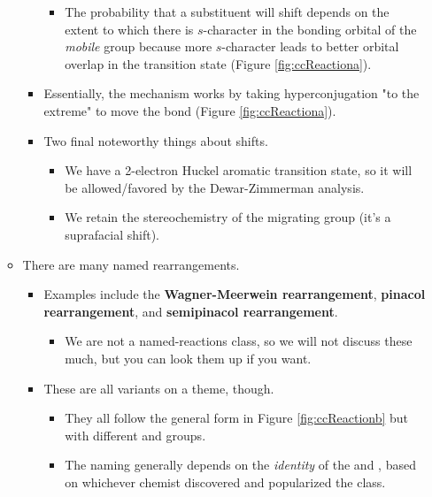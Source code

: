 \documentclass[../notes.tex]{subfiles}
\begin{document}
\begin{itemize}
\begin{itemize}
\begin{itemize}
            \begin{itemize}
                \item The probability that a substituent will shift depends on the extent to which there is $s$-character in the bonding orbital of the \emph{mobile} group because more $s$-character leads to better orbital overlap in the transition state (Figure \ref{fig:ccReactiona}).
            \end{itemize}
            \item Essentially, the mechanism works by taking hyperconjugation "to the extreme" to move the bond (Figure \ref{fig:ccReactiona}).
            \item Two final noteworthy things about shifts.
            \begin{itemize}
                \item We have a 2-electron Huckel aromatic transition state, so it will be allowed/favored by the Dewar-Zimmerman analysis.
                \item We retain the stereochemistry of the migrating group (it's a suprafacial shift).
            \end{itemize}
        \end{itemize}
        \item There are many named rearrangements.
        \begin{itemize}
            \item Examples include the \textbf{Wagner-Meerwein rearrangement}, \textbf{pinacol rearrangement}, and \textbf{semipinacol rearrangement}.
            \begin{itemize}
                \item We are not a named-reactions class, so we will not discuss these much, but you can look them up if you want.
            \end{itemize}
            \item These are all variants on a theme, though.
            \begin{itemize}
                \item They all follow the general form in Figure \ref{fig:ccReactionb} but with different  and  groups.
                \item The naming generally depends on the \emph{identity} of the  and , based on whichever chemist discovered and popularized the class.
            \end{itemize}
        \end{itemize}
    \end{itemize}

\end{itemize}
\end{document}
